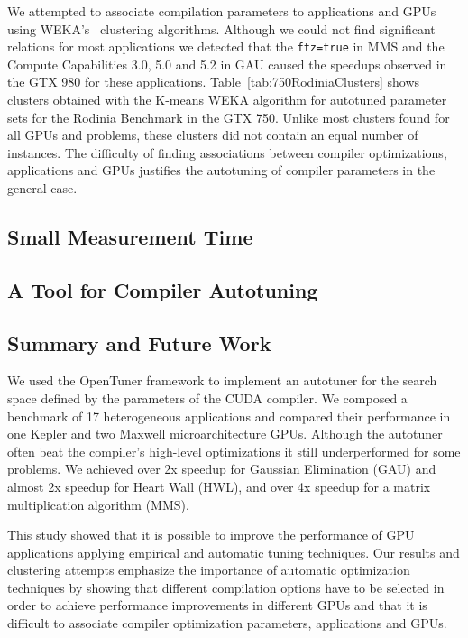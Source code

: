 We attempted to associate compilation parameters to applications and GPUs using
WEKA's~\cite{holmes1994weka} clustering algorithms. Although we could not find
significant relations for most applications we detected that the
\texttt{ftz=true} in MMS and the Compute Capabilities 3.0, 5.0 and 5.2 in GAU
caused the speedups observed in the GTX 980 for these applications.
Table~\ref{tab:750RodiniaClusters} shows clusters obtained with the K-means
WEKA algorithm for autotuned parameter sets for the Rodinia Benchmark in the
GTX 750. Unlike most clusters found for all GPUs and problems, these clusters
did not contain an equal number of instances. The difficulty of finding
associations between compiler optimizations, applications and GPUs justifies
the autotuning of compiler parameters in the general case.


\subsection{Small Measurement Time}
\label{subsec:smalltime}

\subsection{A Tool for Compiler Autotuning}


\subsection{Summary and Future Work}
\label{subsec:GPUconcl}

We used the OpenTuner framework to implement an autotuner for the search space
defined by the parameters of the CUDA compiler. We composed a benchmark of 17
heterogeneous applications and compared their performance in one Kepler and two
Maxwell microarchitecture GPUs.  Although the autotuner often beat the
compiler’s high-level optimizations it still underperformed for some problems.
We achieved over 2x speedup for Gaussian Elimination (GAU) and almost 2x
speedup for Heart Wall (HWL),  and over 4x speedup for a matrix multiplication
algorithm (MMS).

This study showed that it is possible to improve the performance of GPU
applications applying empirical and automatic tuning techniques. Our results
and clustering attempts emphasize the importance of automatic optimization
techniques by showing that different compilation options have to be selected in
order to achieve performance improvements in different GPUs and that it is
difficult to associate compiler optimization parameters, applications and GPUs.

